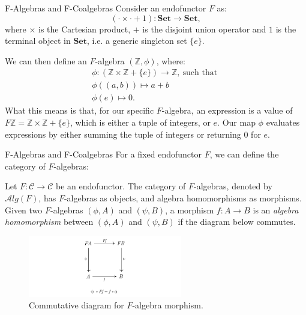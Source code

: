 \documentclass[aspectratio=169,xcolor=dvipsnames,10pt]{beamer}
\theoremstyle{definition}
\begin{document}
\begin{frame}[fragile]{F-Algebras and F-Coalgebras}
    Consider an endofunctor $F$ as:
    \begin{displaymath}
        (\cdot \times \cdot + 1):\mathbf{Set} \to \mathbf{Set},
    \end{displaymath}
    where $\times$ is the Cartesian product, $+$ is the disjoint union operator and $1$ is the terminal
    object in $\mathbf{Set}$, i.e. a generic singleton set $\{e\}$.

    We can then define an $F$-algebra $(\mathbb Z, \phi)$, where:
    \begin{gather*}
        \phi:(\mathbb{Z} \times \mathbb{Z} + \{e\}) \to \mathbb Z, \ \text{such that } \\
        \phi((a,b)) \mapsto a + b \\
        \phi(e) \mapsto 0.
    \end{gather*}
    What this means is that, for our specific $F$-algebra, an expression is a value of
    $F \mathbb Z = \mathbb{Z} \times \mathbb{Z} + \{e\}$, which is either a tuple of
    integers, or $e$. Our map $\phi$ evaluates expressions by either summing 
    the tuple of integers or returning $0$ for $e$.
\end{frame}


\begin{frame}[fragile]{F-Algebras and F-Coalgebras}
    For a fixed endofunctor $F$, we can define the category of $F$-algebras:
    \begin{definition}
        Let $F:\mathcal C \to \mathcal C$ be an endofunctor. The category of
        $F$-algebras, denoted by $\mathcal Alg(F)$,
        has $F$-algebras as objects, and algebra homomorphisms as morphisms.
        Given two $F$-algebras $(\phi, A)$ and $(\psi, B)$,
        a morphism $f:A \to B$ is an \textit{algebra homomorphism}
        between $(\phi, A)$ and $(\psi, B)$ if the diagram below commutes.
    \end{definition}

    \begin{figure}[H]
        \begin{center}
            \includegraphics[width=0.6\textwidth]{../notebooks/F-algebra.pdf}
        \end{center}
        \caption{Commutative diagram for $F$-algebra morphism.}
        \label{fig:falgebra}
    \end{figure}

\end{frame}
\end{document}
